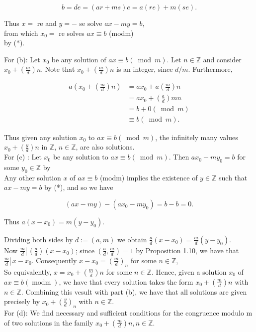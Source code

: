 \documentclass[10pt]{article}
\begin{document}
$$
b=d e=(a r+m s) e=a(r e)+m(s e) .
$$

Thus $x=$ re and $y=-$ se solve $a x-m y=b$,\\
from which $x_{0}=$ re solves $a x \equiv b$ (modm)\\
by (*).

For (b): Let $x_{0}$ be any solution of $a x \equiv b(\bmod m)$. Let $n \in \mathbb{Z}$ and consider $x_{0}+\left(\frac{m}{d}\right) n$. Note that $x_{0}+\left(\frac{m}{d}\right) n$ is an integer, since $d / m$. Furthermore,

$$
\begin{aligned}
a\left(x_{0}+\left(\frac{m}{d}\right) n\right) & =a x_{0}+a\left(\frac{m}{d}\right) n \\
& =a x_{0}+\left(\frac{a}{d}\right) m n \\
& =b+0(\bmod m) \\
& \equiv b(\bmod m) .
\end{aligned}
$$

Thus given any solution $x_{0}$ to $a x \equiv b(\bmod m)$, the infinitely many values $x_{0}+\left(\frac{y}{d}\right) n$ in $\mathbb{Z}$, $n \in \mathbb{Z}$, are also solutions.\\
For (c) : Let $x_{0}$ be any solution to $a x \equiv b(\bmod m)$. Then $a x_{0}-m y_{0}=b$ for some $y_{0} \in \mathbb{Z}$ by\\
Any other solution $x$ of $a x \equiv b$ (modm) implies the existence of $y \in \mathbb{Z}$ such that $a x-m y=b$ by (*), and so we have

$$
(a x-m y)-\left(a x_{0}-m y_{0}\right)=b-b=0 .
$$

Thus $a\left(x-x_{0}\right)=m\left(y-y_{0}\right)$.

Dividing both sides by $d:=(a, m)$ we obtain $\frac{a}{d}\left(x-x_{0}\right)=\frac{m}{d}\left(y-y_{0}\right)$.\\
Now $\frac{m}{d} \left\lvert\,\left(\frac{a}{d}\right)\left(x-x_{0}\right)\right.$; since $\left(\frac{a}{d}, \frac{m}{d}\right)=1$ by Proposition 1.10, we have that $\left.\frac{m}{d} \right\rvert\, x-x_{0}$. Consequently $x-x_{0}=\left(\frac{m}{d}\right)_{n}$ for some $n \in \mathbb{Z}$,\\
So equivalently, $x=x_{0}+\left(\frac{m}{d}\right) n$ for some $n \in \mathbb{Z}$. Hence, given a solution $x_{0}$ of $a x \equiv b(\operatorname{modm})$, we have that every solution takes the form $x_{0}+\left(\frac{m}{d}\right) n$ with $n \in \mathbb{Z}$. Combining this vesult with part (b), we have that all solutions are given precisely by $x_{0}+\left(\frac{y}{d}\right)_{n}$ with $n \in \mathbb{Z}$.\\
For (d): We find necessary and sufficient conditions for the congruence modulo m of two solutions in the family $x_{0}+\left(\frac{m}{d}\right) n, n \in \mathbb{Z}$.
\end{document}
